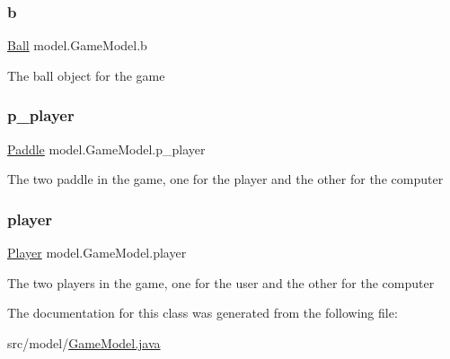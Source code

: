 \subsubsection{\texorpdfstring{b}{b}}
{\footnotesize\ttfamily \hyperlink{classmodel_1_1_ball}{Ball} model.\+Game\+Model.\+b\hspace{0.3cm}{\ttfamily [private]}}

The ball object for the game \hypertarget{classmodel_1_1_game_model_a46b846cead279b52545bb014f946fe47}{}\label{classmodel_1_1_game_model_a46b846cead279b52545bb014f946fe47} 
\subsubsection{\texorpdfstring{p\+\_\+player}{p\_player}}
{\footnotesize\ttfamily \hyperlink{classmodel_1_1_paddle}{Paddle} model.\+Game\+Model.\+p\+\_\+player\hspace{0.3cm}{\ttfamily [private]}}

The two paddle in the game, one for the player and the other for the computer \hypertarget{classmodel_1_1_game_model_aa7997c685bdb47e1af57ea496f4128c0}{}\label{classmodel_1_1_game_model_aa7997c685bdb47e1af57ea496f4128c0} 
\subsubsection{\texorpdfstring{player}{player}}
{\footnotesize\ttfamily \hyperlink{classmodel_1_1_player}{Player} model.\+Game\+Model.\+player\hspace{0.3cm}{\ttfamily [private]}}

The two players in the game, one for the user and the other for the computer 

The documentation for this class was generated from the following file\+:\begin{DoxyCompactItemize}
\item 
src/model/\hyperlink{_game_model_8java}{Game\+Model.\+java}\end{DoxyCompactItemize}

